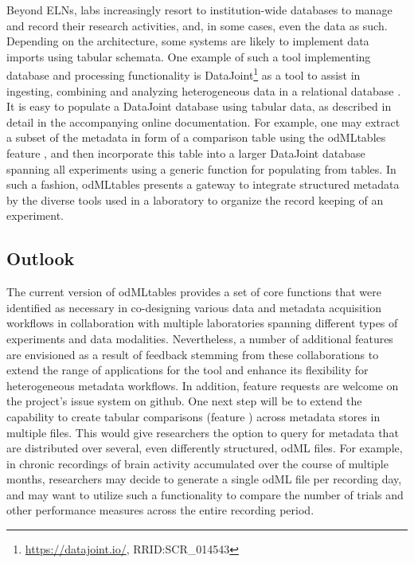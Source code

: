 Beyond ELNs, labs increasingly resort to institution-wide databases to manage and record their research activities, and, in some cases, even the data as such. Depending on the architecture, some systems are likely to implement data imports using tabular schemata. One example of such a tool implementing database and processing functionality is DataJoint\footnote{\url{https://datajoint.io/}, RRID:SCR\_014543} as a tool to assist in ingesting, combining and analyzing heterogeneous data in a relational database \citep{Yatsenko15}. It is easy to populate a DataJoint database using tabular data, as described in detail in the accompanying online documentation. For example, one may extract a subset of the metadata in form of a comparison table using the odMLtables feature \fcompare, and then incorporate this table into a larger DataJoint database spanning all experiments using a generic function for populating from  tables. In such a fashion, odMLtables presents a gateway to integrate structured metadata by the diverse tools used in a laboratory to organize the record keeping of an experiment.

\subsection{Outlook}
The current version of odMLtables provides a set of core functions that were identified as necessary in co-designing various data and metadata acquisition workflows in collaboration with multiple laboratories spanning different types of experiments and data modalities. Nevertheless, a number of additional features are envisioned as a result of feedback stemming from these collaborations to extend the range of applications for the tool and enhance its flexibility for heterogeneous metadata workflows. In addition, feature requests are welcome on the project's issue system on github. One next step will be to extend the capability to create tabular comparisons (feature \fcompare) across metadata stores in multiple files. This would give researchers the option to query for metadata that are distributed over several, even differently structured, odML files. For example, in chronic recordings of brain activity accumulated over the course of multiple months, researchers may decide to generate a single odML file per recording day, and may want to utilize such a functionality to compare the number of trials and other performance measures across the entire recording period.

